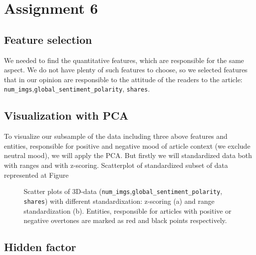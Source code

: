 \section{Assignment 6}
\subsection{Feature selection}
We needed to find the quantitative features, which are responsible for the same aspect. We do not have plenty of such features to choose, so we selected features that in our opinion are responsible to the attitude of the readers to the article: \texttt{num\_imgs},\texttt{global\_sentiment\_polarity},  \texttt{shares}. 

\subsection{Visualization with PCA}
To visualize our subsample of the data including three above features and entities, responsible for positive  and negative mood of article context (we exclude neutral mood), we will apply the PCA. But firstly we will standardized data both with ranges and with z-scoring. Scatterplot of standardized subset of data represented at Figure

\begin{figure}[h]
\begin{minipage}[h]{0.49\linewidth}
\end{minipage}
\hfill
\begin{minipage}[h]{0.49\linewidth}
\end{minipage}
\caption{Scatter plots of 3D-data (\texttt{num\_imgs},\texttt{global\_sentiment\_polarity},  \texttt{shares}) with different standardixation: z-scoring (a) and range standardization (b). Entities, responsible for articles with positive or negative overtones are marked as red and black points respectively.}
\label{fig:PCA_hw6}
\end{figure}

\subsection{Hidden factor}
